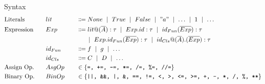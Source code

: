 \documentclass[11pt]{jarticle}
\begin{document}
Syntax
\begin{alignat*}{3} %
  &\text{Literals} &&lit &&\Coloneqq None ~\mid~ True ~\mid~ False ~\mid~ "a" ~\mid~ \dots ~\mid~ 1 ~\mid~ \dots\\
  &\text{Expression}~~~ &&Exp &&\Coloneqq lit@(\overline{A}):\tau ~\mid~ Exp.id:\tau  ~\mid~ id_{Fun}(\overline{Exp}):\tau\\
  &&&&&~~~~~\mid~ Exp.id_{Fun}(\overline{Exp}):\tau ~\mid~ id_{Cls}@(\overline{A}).(\overline{Exp}):\tau\\
  &&&id_{Fun} &&\Coloneqq f ~\mid~ g ~\mid~ \dots\\
  &&&id_{Cls} &&\Coloneqq C ~\mid~ D ~\mid~ \dots\\
  &\text{Assign Op.} &&AsgOp~~~ &&\in \{\texttt{=, +=, -=, *=, /=, \%=, //=}\}\\
  &\text{Binary Op.} &&BinOp &&\in \{\texttt{||, \&\&, |, \&, ==, !=, <, >, <=, >=, +, -, *, /, \%, **}\}
\end{alignat*}
\end{document}
